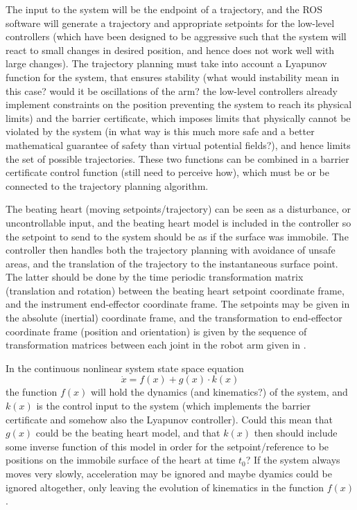 The input to the system will be the endpoint of a trajectory, and the ROS software will generate a trajectory and appropriate setpoints for the low-level controllers (which have been designed to be aggressive such that the system will react to small changes in desired position, and hence does not work well with large changes). The trajectory planning must take into account a Lyapunov function for the system, that ensures stability (what would instability mean in this case? would it be oscillations of the arm? the low-level controllers already implement constraints on the position preventing the system to reach its physical limits) and the barrier certificate, which imposes limits that physically cannot be violated by the system (in what way is this much more safe and a better mathematical guarantee of safety than virtual potential fields?), and hence limits the set of possible trajectories. These two functions can be combined in a barrier certificate control function (still need to perceive how), which must be or be connected to the trajectory planning algorithm.

The beating heart (moving setpoints/trajectory) can be seen as a disturbance, or uncontrollable input, and the beating heart model is included in the controller so the setpoint to send to the system should be as if the surface was immobile. The controller then handles both the trajectory planning with avoidance of unsafe areas, and the translation of the trajectory to the instantaneous surface point. The latter should be done by the time periodic transformation matrix (translation and rotation) between the beating heart setpoint coordinate frame, and the instrument end-effector coordinate frame. The setpoints may be given in the absolute (inertial) coordinate frame, and the transformation to end-effector coordinate frame (position and orientation) is given by the sequence of transformation matrices between each joint in the robot arm given in \cite{bib:heart_model}.

In the continuous nonlinear system state space equation
\begin{equation}
\dot{x}=f(x)+g(x)\cdot k(x)
\end{equation}
the function $f(x)$ will hold the dynamics (and kinematics?) of the system, and $k(x)$ is the control input to the system (which implements the barrier certificate and somehow also the Lyapunov controller). Could this mean that $g(x)$ could be the beating heart model, and that $k(x)$ then should include some inverse function of this model in order for the setpoint/reference to be positions on the immobile surface of the heart at time $t_0$?
If the system always moves very slowly, acceleration may be ignored and maybe dyamics could be ignored altogether, only leaving the evolution of kinematics in the function $f(x)$.

